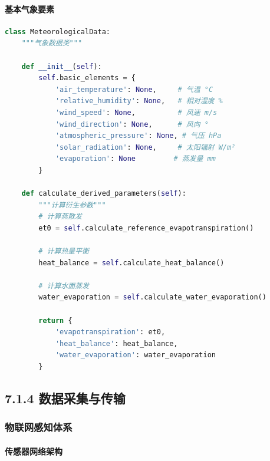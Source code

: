 \paragraph{基本气象要素}\label{ux57faux672cux6c14ux8c61ux8981ux7d20}

\begin{lstlisting}[language=Python]
class MeteorologicalData:
    """气象数据类"""
    
    def __init__(self):
        self.basic_elements = {
            'air_temperature': None,     # 气温 °C
            'relative_humidity': None,   # 相对湿度 %
            'wind_speed': None,          # 风速 m/s
            'wind_direction': None,      # 风向 °
            'atmospheric_pressure': None, # 气压 hPa
            'solar_radiation': None,     # 太阳辐射 W/m²
            'evaporation': None         # 蒸发量 mm
        }
    
    def calculate_derived_parameters(self):
        """计算衍生参数"""
        # 计算蒸散发
        et0 = self.calculate_reference_evapotranspiration()
        
        # 计算热量平衡
        heat_balance = self.calculate_heat_balance()
        
        # 计算水面蒸发
        water_evaporation = self.calculate_water_evaporation()
        
        return {
            'evapotranspiration': et0,
            'heat_balance': heat_balance,
            'water_evaporation': water_evaporation
        }
\end{lstlisting}

\subsection{7.1.4
数据采集与传输}\label{ux6570ux636eux91c7ux96c6ux4e0eux4f20ux8f93}

\subsubsection{物联网感知体系}\label{ux7269ux8054ux7f51ux611fux77e5ux4f53ux7cfb}

\paragraph{传感器网络架构}\label{ux4f20ux611fux5668ux7f51ux7edcux67b6ux6784}

